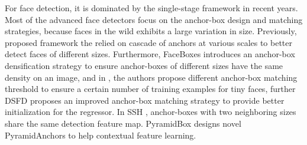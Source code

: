 \documentclass[review]{elsarticle}
\begin{document}
      



For face detection, it is dominated by the single-stage framework in recent years. Most of the advanced face detectors focus on the anchor-box design \cite{yu2018anchor} and matching strategies, because faces in the wild exhibits a large variation in size. Previously, \cite{yu2018anchor} proposed framework the relied on cascade of anchors at various scales to better detect faces of different sizes. Furthermore, FaceBoxes \cite{zhang2017faceboxes} introduces an anchor-box densification strategy to ensure anchor-boxes of different sizes have the same density on an image, and in \cite{zhang2017s3fd,zhu2018seeing}, the authors propose different anchor-box matching threshold to ensure a certain number of training examples for tiny faces, further DSFD \cite{li2018dsfd} proposes an improved anchor-box matching strategy to provide better initialization for the regressor. In SSH \cite{najibi2017ssh}, anchor-boxes with two neighboring sizes share the same detection feature map. PyramidBox \cite{Tang_2018_ECCV} designs novel PyramidAnchors to help contextual feature learning.
\end{document}
